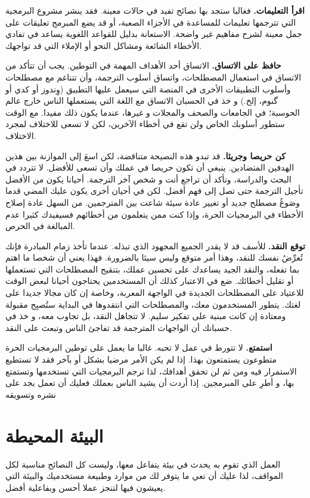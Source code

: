 {\bf اقرأ التعليمات.} فغالبا ستجد بها نصائح تفيد في حالات معينة. فقد
ينشر مشروع البرمجية التي تترجمها تعليمات للمساعدة في الأجزاء الصعبة، أو
قد يضع المبرمج تعليقات على جمل معينة لشرح مفاهيم غير واضحة. الاستعانة
بدليل للقواعد اللغوية يساعد في تفادي الأخطاء الشائعة ومشاكل النحو أو
الإملاء التي قد تواجهك.

{\bf حافظ على الاتساق.} الاتساق أحد الأهداف المهمة في التوطين. يجب أن
تتأكد من الاتساق في استعمال المصطلحات، واتساق أسلوب الترجمة، وأن تتناغم
مع مصطلحات وأسلوب التطبيقات الأخرى في المنصة التي سيعمل عليها التطبيق
(وِندوز أو كدي أو گنوم، إلخ.) و خذ في الحسبان الاتساق مع اللغة التي
يستعملها الناس خارج عالم الحوسبة؛ في الجامعات والصحف والمجلات و غيرها،
عندما يكون ذلك مفيدا. مع الوقت ستطور أسلوبك الخاص ولن تقع في أخطاء
الآخرين، لكن لا تسعى للاختلاف لمجرد الاختلاف.

{\bf كن حريصا وجريئا.} قد تبدو هذه النصيحة متناقضة، لكن اسعَ إلى
الموازنة بين هذين الهدفين المتضادين. ينبغي أن تكون حريصا في عملك وأن
تسعى للأفضل. لا تتردد في البحث والدراسة، وتأكد أن تراجع أنت و شخص آخر
الترجمة. أحيانا يكون من الأفضل تأجيل الترجمة حتى تصل إلى فهم أفضل. لكن
في أحيان أخرى يكون عليك المضي قدما وصَوغُ مصطلح جديد أو تغيير عادة سيئة
شاعت بين المترجمين. من السهل عادة إصلاح الأخطاء في البرمجيات الحرة،
وإذا كنت ممن يتعلمون من أخطائهم فسيفيدك كثيرا عدم المبالغة في الحرص.

{\bf توقع النقد.} للأسف قد لا يقدر الجميع المجهود الذي تبذله. عندما تأخذ
زمام المبادرة فإنك تُعرِّضُ نفسك للنقد، وهذا أمر متوقع وليس سيئا
بالضرورة. فهذا يعني أن شخصا ما اهتم بما تفعله، والنقد الجيد يساعدك على
تحسين عملك، بتنقيح المصطلحات التي تستعملها أو تقليل أخطائك. ضع في
الاعتبار كذلك أن المستخدمين يحتاجون أحيانا لبعض الوقت للاعتياد على
المصطلحات الجديدة في الواجهة المعربة، وخاصة إن كان مجالا جديدا على
لغتك. يتطور المستخدمون معك، والمصطلحات التي انتقدوها في البداية ستُصبِح
مقبولة ومعتادة إن كانت مبنية على تفكير سليم. لا تتجاهل النقد، بل تجاوب
معه، و خذ في حسبانك أن الواجهات المترجمة قد تفاجئ الناس وتبعث على
النقد.

{\bf استمتع.} لا تتورط في عمل لا تحبه. غالبا ما يعمل على توطين البرمجيات
الحرة متطوعون يستمتعون بهذا. إذا لم يكن الأمر مرضيا بشكل أو بآخر فقد لا
تستطيع الاستمرار فيه ومن ثم لن تحقق أهدافك، لذا ترجم البرمجيات التي
تستخدمها وتستمتع بها، و أطرِ على المبرمجين. إذا أردت أن يشيد الناس
بعملك فعليك أن تعمل بجد على نشره وتسويقه

\section{البيئة المحيطة}
العمل الذي تقوم به يحدث في بيئة يتفاعل معها، وليست كل النصائح مناسبة لكل
المواقف، لذا عليك أن تعي ما يتوفر لك من موارد وطبيعة مستخدميك والبيئة
التي يعيشون فيها لتنجز عملا أحسن وبفاعلية أفضل.

